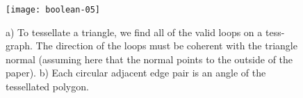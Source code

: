 \begin{figure}[t]
\centering
\texttt{[image: boolean-05]}
\caption{a) To tessellate a triangle, we find all of the valid loops on a tess-graph. The direction of the loops must be coherent with the triangle normal (assuming here that the normal points to the outside of the paper). b) Each circular adjacent edge pair is an angle of the tessellated polygon.}
\label{fig:cadj}
\end{figure}
